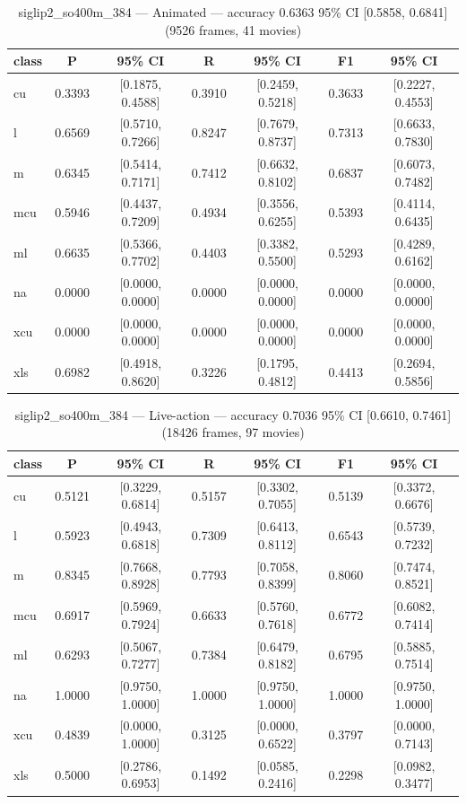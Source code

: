 \begin{table}[htbp]
\centering
\caption{siglip2\_so400m\_384 — Animated — accuracy 0.6363 95\% CI [0.5858, 0.6841] (9526 frames, 41 movies)}
\label{tab:siglip2-so400m-384-animated}
\begin{tabular}{lcccccc}
\toprule
class & P & 95\% CI & R & 95\% CI & F1 & 95\% CI \\
\midrule
cu & 0.3393 & [0.1875, 0.4588] & 0.3910 & [0.2459, 0.5218] & 0.3633 & [0.2227, 0.4553] \\
l & 0.6569 & [0.5710, 0.7266] & 0.8247 & [0.7679, 0.8737] & 0.7313 & [0.6633, 0.7830] \\
m & 0.6345 & [0.5414, 0.7171] & 0.7412 & [0.6632, 0.8102] & 0.6837 & [0.6073, 0.7482] \\
mcu & 0.5946 & [0.4437, 0.7209] & 0.4934 & [0.3556, 0.6255] & 0.5393 & [0.4114, 0.6435] \\
ml & 0.6635 & [0.5366, 0.7702] & 0.4403 & [0.3382, 0.5500] & 0.5293 & [0.4289, 0.6162] \\
na & 0.0000 & [0.0000, 0.0000] & 0.0000 & [0.0000, 0.0000] & 0.0000 & [0.0000, 0.0000] \\
xcu & 0.0000 & [0.0000, 0.0000] & 0.0000 & [0.0000, 0.0000] & 0.0000 & [0.0000, 0.0000] \\
xls & 0.6982 & [0.4918, 0.8620] & 0.3226 & [0.1795, 0.4812] & 0.4413 & [0.2694, 0.5856] \\
\bottomrule
\end{tabular}
\end{table}

\begin{table}[htbp]
\centering
\caption{siglip2\_so400m\_384 — Live-action — accuracy 0.7036 95\% CI [0.6610, 0.7461] (18426 frames, 97 movies)}
\label{tab:siglip2-so400m-384-live-action}
\begin{tabular}{lcccccc}
\toprule
class & P & 95\% CI & R & 95\% CI & F1 & 95\% CI \\
\midrule
cu & 0.5121 & [0.3229, 0.6814] & 0.5157 & [0.3302, 0.7055] & 0.5139 & [0.3372, 0.6676] \\
l & 0.5923 & [0.4943, 0.6818] & 0.7309 & [0.6413, 0.8112] & 0.6543 & [0.5739, 0.7232] \\
m & 0.8345 & [0.7668, 0.8928] & 0.7793 & [0.7058, 0.8399] & 0.8060 & [0.7474, 0.8521] \\
mcu & 0.6917 & [0.5969, 0.7924] & 0.6633 & [0.5760, 0.7618] & 0.6772 & [0.6082, 0.7414] \\
ml & 0.6293 & [0.5067, 0.7277] & 0.7384 & [0.6479, 0.8182] & 0.6795 & [0.5885, 0.7514] \\
na & 1.0000 & [0.9750, 1.0000] & 1.0000 & [0.9750, 1.0000] & 1.0000 & [0.9750, 1.0000] \\
xcu & 0.4839 & [0.0000, 1.0000] & 0.3125 & [0.0000, 0.6522] & 0.3797 & [0.0000, 0.7143] \\
xls & 0.5000 & [0.2786, 0.6953] & 0.1492 & [0.0585, 0.2416] & 0.2298 & [0.0982, 0.3477] \\
\bottomrule
\end{tabular}
\end{table}

